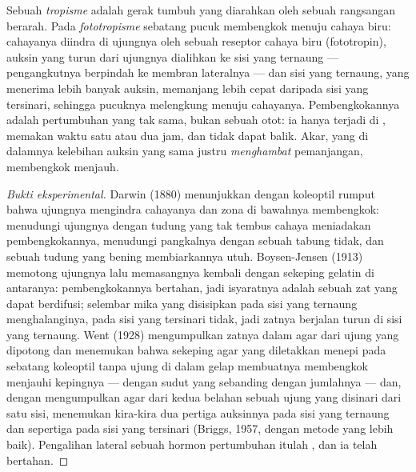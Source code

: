 \begin{proposition}[Fototropisme]\label{prop:b2:plant-plasticity:phototropism}
Sebuah \emph{tropisme} adalah gerak tumbuh yang diarahkan oleh sebuah
rangsangan berarah. Pada \emph{fototropisme} sebatang pucuk membengkok
menuju cahaya biru: cahayanya diindra di ujungnya oleh sebuah reseptor
cahaya biru (fototropin), auksin yang turun dari ujungnya dialihkan ke
sisi yang ternaung --- pengangkutnya berpindah ke membran lateralnya
--- dan sisi yang ternaung, yang menerima lebih banyak auksin,
memanjang lebih cepat daripada sisi yang tersinari, sehingga pucuknya
melengkung menuju cahayanya. Pembengkokannya adalah pertumbuhan yang
tak sama, bukan sebuah otot: ia hanya terjadi di ,
memakan waktu satu atau dua jam, dan tidak dapat balik. Akar, yang di
dalamnya kelebihan auksin yang sama justru \emph{menghambat}
pemanjangan, membengkok menjauh.
\end{proposition}
\begin{proof}[Bukti eksperimental]
Darwin (1880) menunjukkan dengan koleoptil rumput bahwa ujungnya
mengindra cahayanya dan zona di bawahnya membengkok: menudungi ujungnya
dengan tudung yang tak tembus cahaya meniadakan pembengkokannya,
menudungi pangkalnya dengan sebuah tabung tidak, dan sebuah tudung yang
bening membiarkannya utuh. Boysen-Jensen (1913) memotong ujungnya lalu
memasangnya kembali dengan sekeping gelatin di antaranya: pembengkokannya
bertahan, jadi isyaratnya adalah sebuah zat yang dapat berdifusi;
selembar mika yang disisipkan pada sisi yang ternaung menghalanginya,
pada sisi yang tersinari tidak, jadi zatnya berjalan turun di sisi yang
ternaung. Went (1928) mengumpulkan zatnya dalam agar dari ujung yang
dipotong dan menemukan bahwa sekeping agar yang diletakkan menepi pada
sebatang koleoptil tanpa ujung di dalam gelap membuatnya membengkok
menjauhi kepingnya --- dengan sudut yang sebanding dengan jumlahnya ---
dan, dengan mengumpulkan agar dari kedua belahan sebuah ujung yang
disinari dari satu sisi, menemukan kira-kira dua pertiga auksinnya pada
sisi yang ternaung dan sepertiga pada sisi yang tersinari (Briggs, 1957,
dengan metode yang lebih baik). Pengalihan lateral sebuah hormon
pertumbuhan itulah , dan ia telah bertahan.
\end{proof}

